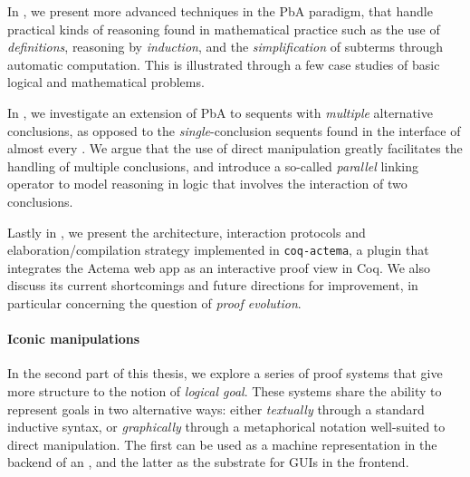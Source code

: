 In , we present more advanced techniques in the PbA paradigm,
that handle practical kinds of reasoning found in mathematical practice such as
the use of \emph{definitions}, reasoning by \emph{induction}, and the
\emph{simplification} of subterms through automatic computation. This is
illustrated through a few case studies of basic logical and mathematical
problems.

In , we investigate an extension of PbA to sequents with
\emph{multiple} alternative conclusions, as opposed to the
\emph{single}-conclusion sequents found in the interface of almost every . We
argue that the use of direct manipulation greatly facilitates the handling of
multiple conclusions, and introduce a so-called \emph{parallel} linking operator
to model reasoning in  logic that involves the interaction of two
conclusions.

Lastly in , we present the architecture, interaction protocols and
elaboration/compilation strategy implemented in \texttt{coq-actema}, a plugin
that integrates the Actema web app as an interactive proof view in Coq. We also
discuss its current shortcomings and future directions for improvement, in
particular concerning the question of \emph{proof evolution}.

\paragraph{Iconic manipulations}
  
In the second part of this thesis, we explore a series of  proof
systems that give more structure to the notion of \emph{logical goal}. These
systems share the ability to represent goals in two alternative ways: either
\emph{textually} through a standard inductive syntax, or \emph{graphically}
through a metaphorical notation well-suited to direct manipulation. The first
can be used as a machine representation in the backend of an , and the latter
as the substrate for GUIs in the frontend.

